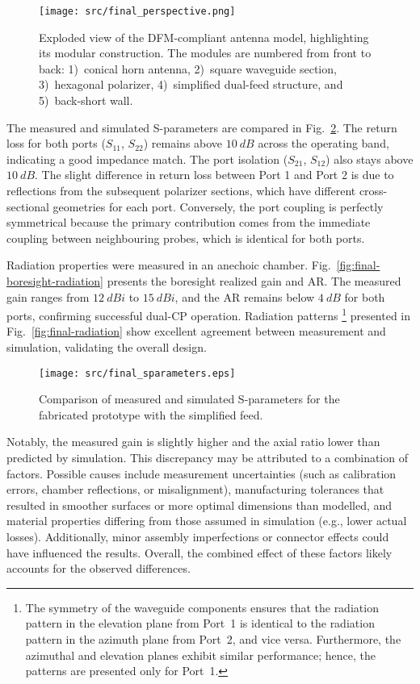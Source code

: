 \documentclass[journal]{IEEEtran}
\begin{document}
\begin{figure}[!b]
\centering
\texttt{[image: src/final\_perspective.png]}
\caption{\label{fig:final-perspective}Exploded view of the DFM-compliant antenna model, highlighting its modular construction. The modules are numbered from front to back: 1)~conical horn antenna, 2)~square waveguide section, 3)~hexagonal polarizer, 4)~simplified dual-feed structure, and 5)~back-short wall.}
\end{figure}

The measured and simulated S-parameters are compared in Fig.~\ref{fig:final-sparameters}. The return loss for both ports ($S_{11}$, $S_{22}$) remains above $\qty{10}{dB}$ across the operating band, indicating a good impedance match. The port isolation ($S_{21}$, $S_{12}$) also stays above $\qty{10}{dB}$. The slight difference in return loss between Port 1 and Port 2 is due to reflections from the subsequent polarizer sections, which have different cross-sectional geometries for each port. Conversely, the port coupling is perfectly symmetrical because the primary contribution comes from the immediate coupling between neighbouring probes, which is identical for both ports.

Radiation properties were measured in an anechoic chamber. Fig.~\ref{fig:final-boresight-radiation} presents the boresight realized gain and AR. The measured gain ranges from $\qty{12}{dBi}$ to $\qty{15}{dBi}$, and the AR remains below $\qty{4}{dB}$ for both ports, confirming successful dual-CP operation. Radiation patterns%
    \footnote{The symmetry of the waveguide components ensures that the radiation pattern in the elevation plane from Port~1 is identical to the radiation pattern in the azimuth plane from Port~2, and vice versa. Furthermore, the azimuthal and elevation planes exhibit similar performance; hence, the patterns are presented only for Port~1.}
presented in Fig.~\ref{fig:final-radiation} show excellent agreement between measurement and simulation, validating the overall design.

\begin{figure}[!b]
\centering
\texttt{[image: src/final\_sparameters.eps]}
\caption{\label{fig:final-sparameters}Comparison of measured and simulated S-parameters for the fabricated prototype with the simplified feed.}
\end{figure}

Notably, the measured gain is slightly higher and the axial ratio lower than predicted by simulation. This discrepancy may be attributed to a combination of factors. Possible causes include measurement uncertainties (such as calibration errors, chamber reflections, or misalignment), manufacturing tolerances that resulted in smoother surfaces or more optimal dimensions than modelled, and material properties differing from those assumed in simulation (e.g., lower actual losses). Additionally, minor assembly imperfections or connector effects could have influenced the results. Overall, the combined effect of these factors likely accounts for the observed differences.
\end{document}
